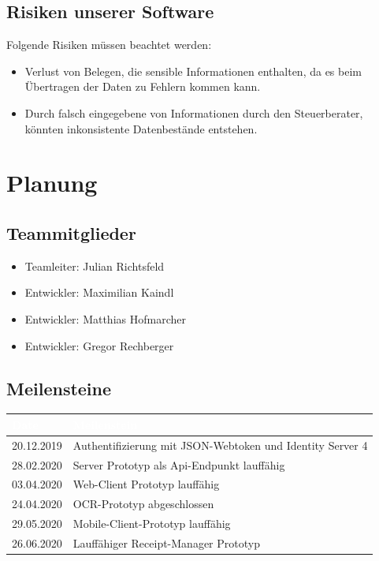 \documentclass[12pt]{article}
\theoremstyle{definition}
\begin{document}
\subsection{Risiken unserer Software}

Folgende Risiken müssen beachtet werden:
\begin{itemize}
  \item Verlust von Belegen, die sensible 
  Informationen enthalten, da es beim Übertragen der 
  Daten zu Fehlern kommen kann.
  \item Durch falsch eingegebene von Informationen 
  durch den Steuerberater, könnten inkonsistente 
  Datenbestände entstehen.
\end{itemize}

\pagebreak

\section{Planung}

\subsection{Teammitglieder}

\begin{itemize}
\item Teamleiter: Julian Richtsfeld
\item Entwickler: Maximilian Kaindl
\item Entwickler: Matthias Hofmarcher
\item Entwickler: Gregor Rechberger
\end{itemize}

\subsection{Meilensteine}

\begin{tabular}{|l|l|}
  \hline
  \cellcolor[gray]{0.5}\textcolor{white}{Date}
  &\cellcolor[gray]{0.5}\textcolor{white}{Meilenstein} 
  \\ \hline \hline
  20.12.2019&Authentifizierung mit JSON-Webtoken und
  Identity Server 4
  \\ \hline
  28.02.2020&Server Prototyp als Api-Endpunkt lauffähig 
  \\ \hline
  03.04.2020&Web-Client Prototyp lauffähig 
  \\ \hline
  24.04.2020&OCR-Prototyp abgeschlossen 
  \\ \hline
  29.05.2020&Mobile-Client-Prototyp lauffähig
  \\ \hline
  26.06.2020&Lauffähiger Receipt-Manager Prototyp
  \\ \hline
\end{tabular}
\end{document}
